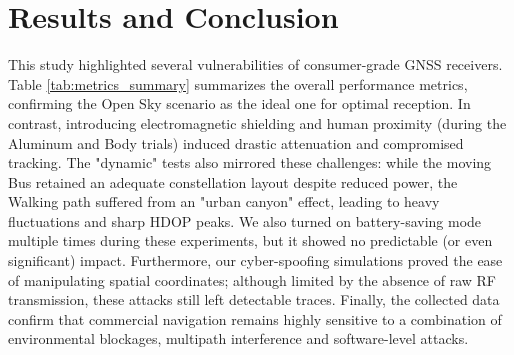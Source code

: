 \section{Results and Conclusion}
\label{sec:conclusion}
This study highlighted several vulnerabilities of consumer-grade GNSS receivers. Table \ref{tab:metrics_summary} summarizes the overall performance metrics, confirming the Open Sky scenario as the ideal one for optimal reception. In contrast, introducing electromagnetic shielding and human proximity (during the Aluminum and Body trials) induced drastic attenuation and compromised tracking. The "dynamic" tests also mirrored these challenges: while the moving Bus retained an adequate constellation layout despite reduced power, the Walking path suffered from an "urban canyon" effect, leading to heavy fluctuations and sharp HDOP peaks. We also turned on battery-saving mode multiple times during these experiments, but it showed no predictable (or even significant) impact. Furthermore, our cyber-spoofing simulations proved the ease of manipulating spatial coordinates; although limited by the absence of raw RF transmission, these attacks still left detectable traces. Finally, the collected data confirm that commercial navigation remains highly sensitive to a combination of environmental blockages, multipath interference and software-level attacks.
\\
\begin{table}[htbp]
    \centering
    \caption{Signal Quality and Satellite Geometry}
    \label{tab:metrics_summary}
\end{table}

